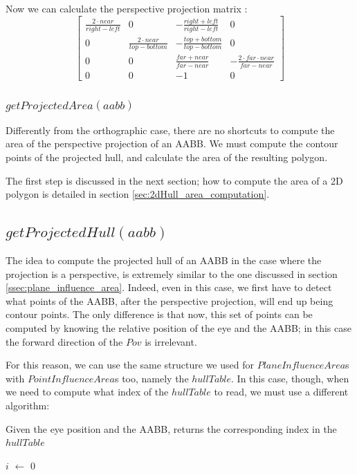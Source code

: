 \documentclass{PoliMi_MasterThesis}
\newcommand*\Let[2]{\State #1 $\gets$ #2}
\begin{document}
Now we can calculate the perspective projection matrix \cite{matrices_3d}:
\begin{equation}
	\begin{bmatrix}
		\frac{2\cdot near}{right-left} & 0 & -\frac{right+left}{right-left} & 0 \\
		0 & \frac{2\cdot near}{top-bottom} & -\frac{top+bottom}{top-bottom} & 0 \\
		0 & 0 & \frac{far+near}{far-near} & -\frac{2\cdot far \cdot near}{far-near} \\
		0 & 0 & -1 & 0
	\end{bmatrix}
\end{equation}

\subsubsection*{$getProjectedArea(aabb)$}
Differently from the orthographic case, there are no shortcuts to compute the area of the perspective projection of an AABB. We must compute the contour points of the projected hull, and calculate the area of the resulting polygon.

The first step is discussed in the next section; how to compute the area of a 2D polygon is detailed in section \ref{sec:2dHull_area_computation}.

\subsection*{$getProjectedHull(aabb)$}
The idea to compute the projected hull of an AABB in the case where the projection is a perspective, is extremely similar to the one discussed in section \ref{ssec:plane_influence_area}. Indeed, even in this case, we first have to detect what points of the AABB, after the perspective projection, will end up being contour points. The only difference is that now, this set of points can be computed by knowing the relative position of the eye and the AABB; in this case the forward direction of the $Pov$ is irrelevant. 

For this reason, we can use the same structure we used for $PlaneInfluenceArea$s with $PointInfluenceArea$s too, namely the $hullTable$. In this case, though, when we need to compute what index of the $hullTable$ to read, we must use a different algorithm:

\begin{algorithm}[H]
	\caption{Given the eye position and the AABB, returns the corresponding index in the $hullTable$}
	\begin{algorithmic}[1]
		\Let{$i$}{0}
		\State{$\textbf{if}\; eye.x < aabb.min.x \; \textbf{then} \; i = i | 1$}
		\State {}
		\EndFunction
	\end{algorithmic}
\end{algorithm} 
\end{document}
